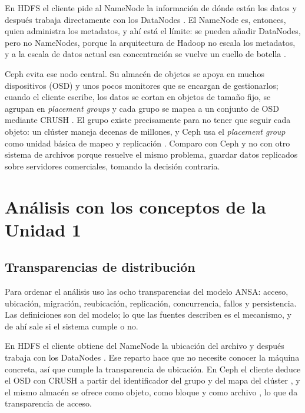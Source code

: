 \documentclass[12pt,a4paper]{article}
\begin{document}
En HDFS el cliente pide al NameNode la información de dónde están los datos y después trabaja directamente con los DataNodes \cite[p.~4]{kim2021erasure}. El NameNode es, entonces, quien administra los metadatos, y ahí está el límite: se pueden añadir DataNodes, pero no NameNodes, porque la arquitectura de Hadoop no escala los metadatos, y a la escala de datos actual esa concentración se vuelve un cuello de botella \cite[p.~2830]{dhulavvagol2023performance}.

Ceph evita ese nodo central. Su almacén de objetos se apoya en muchos dispositivos (OSD) y unos pocos monitores que se encargan de gestionarlos; cuando el cliente escribe, los datos se cortan en objetos de tamaño fijo, se agrupan en \emph{placement groups} y cada grupo se mapea a un conjunto de OSD mediante CRUSH \cite[p.~1128]{li2023ceph}. El grupo existe precisamente para no tener que seguir cada objeto: un clúster maneja decenas de millones, y Ceph usa el \emph{placement group} como unidad básica de mapeo y replicación \cite[p.~4]{chum2021supporting}. Comparo con Ceph y no con otro sistema de archivos porque resuelve el mismo problema, guardar datos replicados sobre servidores comerciales, tomando la decisión contraria.

\section{Análisis con los conceptos de la Unidad 1}

\subsection{Transparencias de distribución}

Para ordenar el análisis uso las ocho transparencias del modelo ANSA: acceso, ubicación, migración, reubicación, replicación, concurrencia, fallos y persistencia. Las definiciones son del modelo; lo que las fuentes describen es el mecanismo, y de ahí sale si el sistema cumple o no.

En HDFS el cliente obtiene del NameNode la ubicación del archivo y después trabaja con los DataNodes \cite[p.~4]{kim2021erasure}. Ese reparto hace que no necesite conocer la máquina concreta, así que cumple la transparencia de ubicación. En Ceph el cliente deduce el OSD con CRUSH a partir del identificador del grupo y del mapa del clúster \cite[p.~1128]{li2023ceph}, y el mismo almacén se ofrece como objeto, como bloque y como archivo \cite[p.~3]{chum2021supporting}, lo que da transparencia de acceso.
\end{document}
